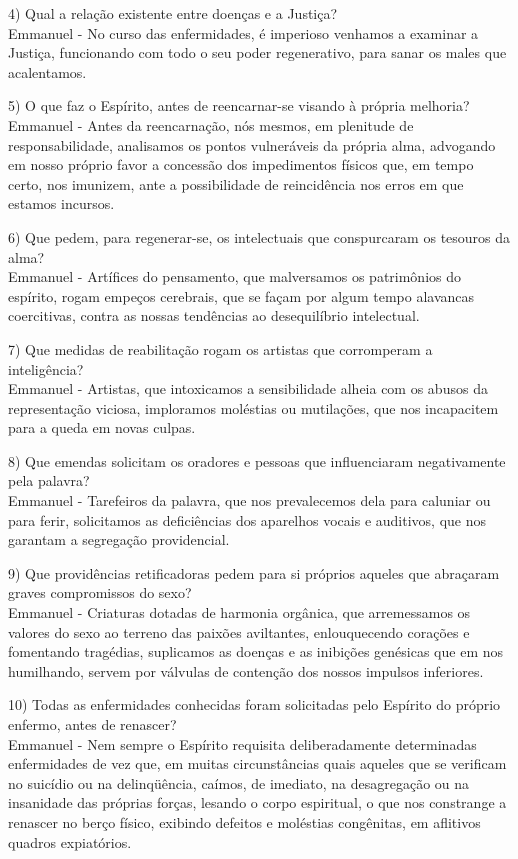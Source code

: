 \emdash{}4) Qual a relação existente entre doenças e a Justiça?\\
\emdash{}Emmanuel - No curso das enfermidades, é imperioso venhamos a examinar a Justiça, funcionando com todo o seu poder regenerativo, para sanar os males que acalentamos.

\emdash{}5) O que faz o Espírito, antes de reencarnar-se visando à própria melhoria?\\
\emdash{}Emmanuel - Antes da reencarnação, nós mesmos, em plenitude de responsabilidade, analisamos os pontos vulneráveis da própria alma, advogando em nosso próprio favor a concessão dos impedimentos físicos que, em tempo certo, nos imunizem, ante a possibilidade de reincidência nos erros em que estamos incursos.

\emdash{}6) Que pedem, para regenerar-se, os intelectuais que conspurcaram os tesouros da alma?\\
\emdash{}Emmanuel - Artífices do pensamento, que malversamos os patrimônios do espírito, rogam empeços cerebrais, que se façam por algum tempo alavancas coercitivas, contra as nossas tendências ao desequilíbrio intelectual.

\emdash{}7) Que medidas de reabilitação rogam os artistas que corromperam a inteligência?\\
\emdash{}Emmanuel - Artistas, que intoxicamos a sensibilidade alheia com os abusos da representação viciosa, imploramos moléstias ou mutilações, que nos incapacitem para a queda em novas culpas.

\emdash{}8) Que emendas solicitam os oradores e pessoas que influenciaram negativamente pela palavra?\\
\emdash{}Emmanuel - Tarefeiros da palavra, que nos prevalecemos dela para caluniar ou para ferir, solicitamos as deficiências dos aparelhos vocais e auditivos, que nos garantam a segregação providencial.

\emdash{}9) Que providências retificadoras pedem para si próprios aqueles que abraçaram graves compromissos do sexo?\\
\emdash{}Emmanuel - Criaturas dotadas de harmonia orgânica, que arremessamos os valores do sexo ao terreno das paixões aviltantes, enlouquecendo corações e fomentando tragédias, suplicamos as doenças e as inibições genésicas que em nos humilhando, servem por válvulas de contenção dos nossos impulsos inferiores.

\emdash{}10) Todas as enfermidades conhecidas foram solicitadas pelo Espírito do próprio enfermo, antes de renascer?\\
\emdash{}Emmanuel - Nem sempre o Espírito requisita deliberadamente determinadas enfermidades de vez que, em muitas circunstâncias quais aqueles que se verificam no suicídio ou na delinqüência, caímos, de imediato, na desagregação ou na insanidade das próprias forças, lesando o corpo espiritual, o que nos constrange a renascer no berço físico, exibindo defeitos e moléstias congênitas, em aflitivos quadros expiatórios.

